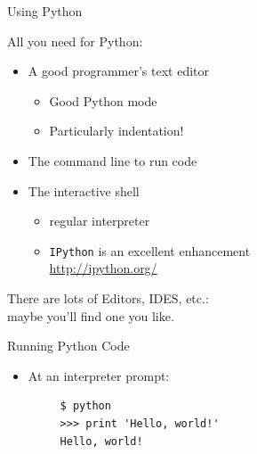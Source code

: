 \documentclass{beamer}
\begin{document}
\begin{frame}[fragile]{Using Python}

{All you need for Python:}
\begin{itemize}
  \item  A good programmer's text editor
    \begin{itemize}
      \item Good Python mode
      \item Particularly indentation!
    \end{itemize}
  \item  The command line to run code
  \item  The interactive shell
    \begin{itemize}
      \item regular interpreter
      \item \verb+IPython+ is an excellent enhancement\\
        \url{http://ipython.org/}
    \end{itemize}
\end{itemize}

\vspace{.2in}
There are lots of Editors, IDES, etc.:\\
   maybe you'll find one you like.

\end{frame} 

\begin{frame}[fragile]{Running Python Code}

\begin{itemize}
  \item At an interpreter prompt:\\
   \begin{verbatim}
     $ python 
     >>> print 'Hello, world!' 
     Hello, world!
   \end{verbatim}
\end{itemize}

\end{frame} 
\end{document}
